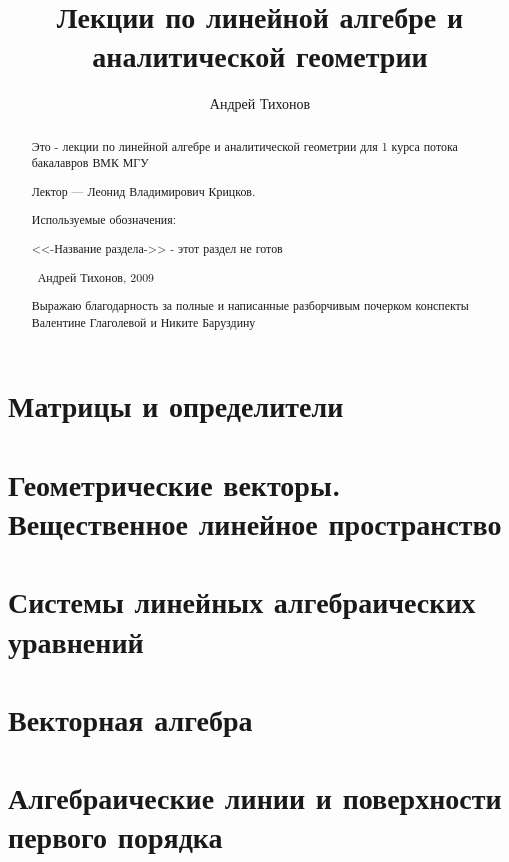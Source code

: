 \documentclass[draft]{report}
\title{Лекции по линейной алгебре и аналитической геометрии}
\theoremstyle{remark}
\begin{document}
\author{Андрей Тихонов}
\maketitle
\begin{abstract}
Это - лекции по линейной алгебре и аналитической геометрии для 1 курса потока бакалавров ВМК МГУ

Лектор --- Леонид Владимирович Крицков.

Используемые обозначения:

<<-Название раздела->> - этот раздел не готов

%
\textcopyright\ Андрей Тихонов, 2009

Выражаю благодарность за полные и написанные разборчивым почерком конспекты Валентине Глаголевой и Никите Баруздину
\end{abstract}
\tableofcontents
\part{Матрицы и определители}

\part{Геометрические векторы. Вещественное линейное пространство}

\part{Системы линейных алгебраических уравнений}

\part{Векторная алгебра}

\part{Алгебраические линии и поверхности первого порядка}

\end{document}
